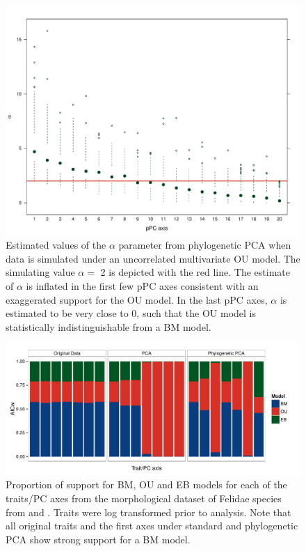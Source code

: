 \documentclass[12pt,twoside]{article}
\begin{document}
\begin{figure}[p]
\centering
\includegraphics[scale=0.65]{fig/alpha-est.pdf}
\caption[Estimates of the $\alpha$ parameter from phylogenetic PCA]{Estimated values of the $\alpha$ parameter from phylogenetic PCA when data is simulated under an uncorrelated multivariate OU model. The simulating value $\alpha=$ 2 is depicted with the red line. The estimate of $\alpha$ is inflated in the first few pPC axes consistent with an exaggerated support for the OU model. In the last pPC axes, $\alpha$ is estimated to be very close to 0, such that the OU model is statistically indistinguishable from a BM model.}
\label{alpha}
\end{figure}

\begin{figure}[p]
\centering
\includegraphics[scale=0.65]{fig/felidae_aicw.pdf}
\caption[Model support on the Felidae dataset]{Proportion of support for BM, OU and EB models for each of the traits/PC axes from the morphological dataset of Felidae species from \citet{Slater_2009} and \citet{sakamoto_2010}. Traits were log transformed prior to analysis. Note that all original traits and the first axes under standard and phylogenetic PCA show strong support for a BM model.}
\label{felidae.aicw}
\end{figure}
\end{document}
